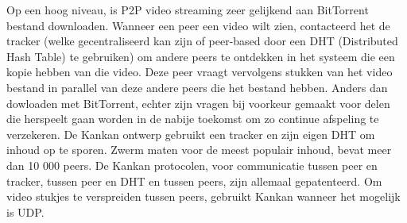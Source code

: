 
Op een hoog niveau, is P2P video streaming zeer gelijkend aan BitTorrent bestand downloaden. Wanneer een peer een video wilt zien, contacteerd het de tracker (welke gecentraliseerd kan zijn of peer-based door een DHT (Distributed Hash Table) te gebruiken) om andere peers te ontdekken in het systeem die een kopie hebben van die video. Deze peer vraagt vervolgens stukken van het video bestand in parallel van deze andere peers die het bestand hebben. Anders dan dowloaden met BitTorrent, echter zijn vragen bij voorkeur gemaakt voor delen die herspeelt gaan worden in de nabije toekomst om zo continue afspeling te verzekeren. De Kankan ontwerp gebruikt een tracker en zijn eigen DHT om inhoud op te sporen. Zwerm maten voor de meest populair inhoud, bevat meer dan 10 000 peers. De Kankan protocolen, voor communicatie tussen peer en tracker, tussen peer en DHT en tussen peers, zijn allemaal gepatenteerd. Om video stukjes te verspreiden tussen peers, gebruikt Kankan wanneer het mogelijk is UDP.